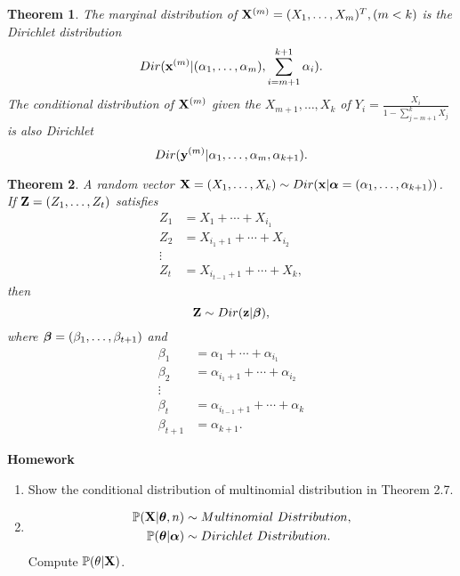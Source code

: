 \documentclass[11pt]{article}
\def\BP{{\bf P}}
\def\X{{\bf X}}
\def\x{{\bf x}}
\def\y{{\bf y}}
\def\Z{{\bf Z}}
\def\z{{\bf z}}
\def\BP{{\mathbb P}}
\def\tha{\mbox{\boldmath$\theta$\unboldmath}}
\def\aph{\mbox{\boldmath$\alpha$\unboldmath}}
\def\bt{\mbox{\boldmath$\beta$\unboldmath}}
\newtheorem{theorem}{Theorem}[section]
\begin{document}
\begin{theorem}
	The marginal distribution of $\X^{(m)}=(X_1,\dots,X_m)^T, (m<k)$ is the Dirichlet distribution
		$$Dir(\x^{(m)}|(\alpha_1,\dots,\alpha_m),\sum_{i=m+1}^{k+1}\alpha_i).$$
	The conditional distribution of $\X^{(m)}$ given the $X_{m+1},\dots,X_k$ of $Y_i = \frac{X_i}{1-\sum_{j=m+1}^k X_j}$ is also Dirichlet 
		$$Dir(\y^{(m)}|\alpha_1,\dots, \alpha_m,\alpha_{k+1}).$$
\end{theorem}

\begin{theorem}
	A random vector $\X=(X_1,\dots,X_k) \sim Dir(\x|\aph=(\alpha_1,\dots,\alpha_{k+1}))$. If $\Z=(Z_1,\dots,Z_t)$ satisfies 
	\begin{align}
		Z_1&=X_1+\cdots+X_{i_1}\\
		Z_2&=X_{i_1+1}+\cdots +X_{i_2}\\
		\vdots\\
		Z_t&=X_{i_{t-1}+1}+\cdots +X_k,
	\end{align}
	then 
		$$\Z \sim Dir(\z|\bt),$$
	where $\bt=(\beta_1,\dots,\beta_{t+1})$ and
		\begin{align*}
			\beta_1 &= \alpha_1+\cdots+\alpha_{i_1}\\
			\beta_2 &= \alpha_{i_1+1}+\cdots+\alpha_{i_2}\\
			\vdots\\
			\beta_t&= \alpha_{i_{t-1}+1}+\cdots +\alpha_k\\
			\beta_{t+1} &= \alpha_{k+1}.
		\end{align*}
\end{theorem}

{\bf Homework}
\begin{enumerate}
\item
Show the conditional distribution of multinomial distribution in Theorem 2.7.
\item
\begin{align*}
	\BP(\X|\tha,n)		&\sim Multinomial\ Distribution,\\
	\BP(\tha|\aph) 	&\sim Dirichlet\ Distribution.
\end{align*}
Compute $\BP(\theta|\X)$.
\end{enumerate}
\end{document}
